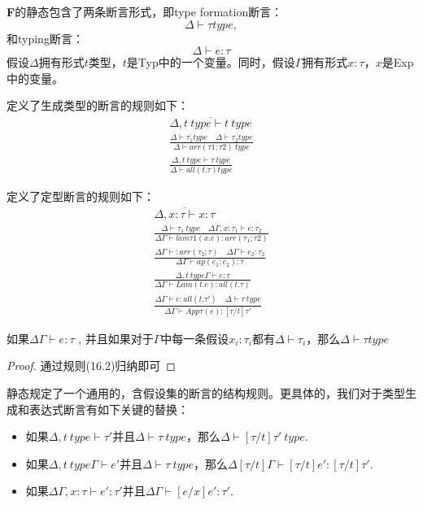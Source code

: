 \textbf{F}的静态包含了两条断言形式，即type formation断言：
$$\Delta \vdash \tau type,$$
和typing断言：
$$\Delta \vdash e:\tau$$
假设$\Delta$拥有形式$t$类型，$t$是Typ中的一个变量。同时，假设$\Gamma$拥有形式$x:\tau$，$x$是Exp中的变量。

定义了生成类型的断言的规则如下：
\begin{gather}
  \overline{\Delta, t \ type \vdash t \ type} \\
  \frac{\Delta \vdash \tau_{1} type \quad \Delta \vdash \tau_{2} type}{\Delta \vdash arr(\tau 1; \tau 2)\ type} \\
  \frac{\Delta, t\ type \vdash \tau \ type}{\Delta \vdash all(t.\tau) type}
\end{gather}

定义了定型断言的规则如下：
\begin{gather}
  \overline{\Delta, x:\tau \vdash x:\tau} \\
  \frac{\Delta \vdash \tau_1 \ type \quad \Delta \Gamma, x : \tau_1 \vdash e : \tau_2}{\Delta \Gamma \vdash lam{\tau1}(x.e): arr(\tau_1;\tau2)} \\
  \frac{\Delta \Gamma \vdash : arr(\tau_2;\tau) \quad \Delta \Gamma \vdash e_2: \tau_2}{\Delta \Gamma \vdash ap(e_1;e_2):\tau} \\
  \frac{\Delta, t \ type \Gamma \vdash e:\tau}{\Delta \Gamma \vdash Lam(t.e):all(t.\tau)} \\
  \frac{\Delta \Gamma \vdash e:all(t.\tau') \quad \Delta \vdash \tau \ type}{\Delta \Gamma \vdash App {\tau}(e):[\tau/t]\tau'}
\end{gather}

\begin{lemma}[规律性]
  如果$\Delta \Gamma \vdash e:\tau$ , 并且如果对于$\Gamma$中每一条假设$x_i:\tau_i$都有$\Delta \vdash \tau_i$，那么$\Delta \vdash \tau type$
\end{lemma}
\begin{proof}
  通过规则(16.2)归纳即可
\end{proof}

静态规定了一个通用的，含假设集的断言的结构规则。更具体的，我们对于类型生成和表达式断言有如下关键的替换：
\begin{lemma}[替换]
  \begin{itemize}
    \item 如果$\Delta, t\ type \vdash \tau' 并且 \Delta \vdash \tau \ type，那么\Delta \vdash [\tau /t]\tau' \ type.$
    \item 如果$\Delta, t\ type \Gamma \vdash e' 并且 \Delta \vdash \tau \ type，那么\Delta [\tau /t]\Gamma \vdash [\tau /t]e':[\tau /t]\tau'.$
    \item 如果$\Delta \Gamma ,x:\tau \vdash e':\tau' 并且\Delta \Gamma \vdash [e/x]e':\tau'.$
  \end{itemize}
\end{lemma}

